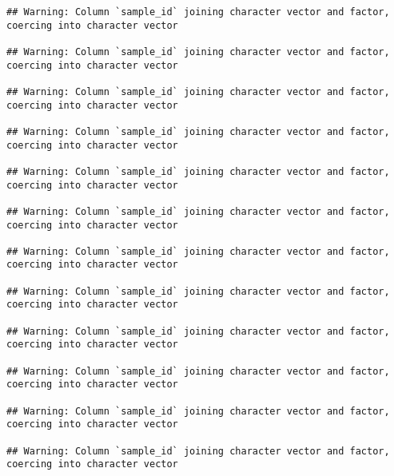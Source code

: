 \documentclass[]{article}
\begin{document}
\begin{verbatim}
## Warning: Column `sample_id` joining character vector and factor, coercing into character vector

## Warning: Column `sample_id` joining character vector and factor, coercing into character vector

## Warning: Column `sample_id` joining character vector and factor, coercing into character vector

## Warning: Column `sample_id` joining character vector and factor, coercing into character vector

## Warning: Column `sample_id` joining character vector and factor, coercing into character vector

## Warning: Column `sample_id` joining character vector and factor, coercing into character vector

## Warning: Column `sample_id` joining character vector and factor, coercing into character vector

## Warning: Column `sample_id` joining character vector and factor, coercing into character vector

## Warning: Column `sample_id` joining character vector and factor, coercing into character vector

## Warning: Column `sample_id` joining character vector and factor, coercing into character vector

## Warning: Column `sample_id` joining character vector and factor, coercing into character vector

## Warning: Column `sample_id` joining character vector and factor, coercing into character vector
\end{verbatim}
\end{document}

